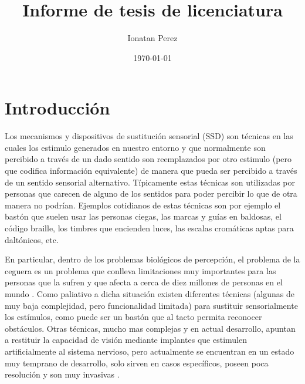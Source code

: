 \documentclass{article}
\title{Informe de tesis de licenciatura}
\author{Ionatan Perez}
\date{\today}
\begin{document}



\renewcommand{\lstlistingname}{Código}




\maketitle

\clearpage 

\tableofcontents  %
\clearpage

\section{Introducción}

    Los mecanismos y dispositivos de sustitución sensorial (SSD) son técnicas en las cuales los estimulo generados en nuestro entorno y que normalmente son percibido a través de un dado sentido son reemplazados por otro estimulo (pero que codifica información equivalente) de manera que pueda ser percibido a través de un sentido sensorial alternativo. Típicamente estas técnicas son utilizadas por personas que carecen de alguno de los sentidos para poder percibir lo que de otra manera no podrían. Ejemplos cotidianos de estas técnicas son por ejemplo el bastón que suelen usar las personas ciegas, las marcas y guías en baldosas, el código braille, los timbres que encienden luces, las escalas cromáticas aptas para daltónicos, etc. 
    
    En particular, dentro de los problemas biológicos de percepción, el problema de la ceguera es un problema que conlleva limitaciones muy importantes para las personas que la sufren y que afecta a cerca de diez millones de personas en el mundo \cite{NroCiegos}. Como paliativo a dicha situación existen diferentes técnicas (algunas de muy baja complejidad, pero funcionalidad limitada) para sustituir sensorialmente los estímulos, como puede ser un bastón que al tacto permita reconocer obstáculos. Otras técnicas, mucho mas complejas y en actual desarrollo, apuntan a restituir la capacidad de visión mediante implantes que estimulen artificialmente al sistema nervioso\cite{Implantes1,Implantes2}, pero actualmente se encuentran en un estado muy temprano de desarrollo, solo sirven en casos específicos, poseen poca resolución y son muy invasivas \cite{Implantes3,Implantes4}. 
    
\end{document}
